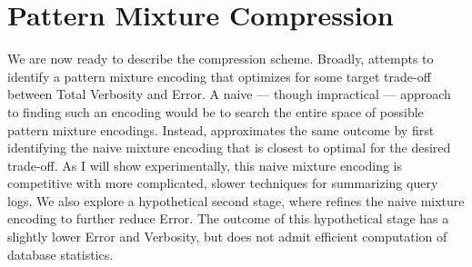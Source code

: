 \section{Pattern Mixture Compression}
\label{sec:constructingencodings}
We are now ready to describe the \systemnameone compression scheme.
Broadly, \systemnameone attempts to identify a pattern mixture encoding that optimizes for some target trade-off between Total Verbosity and Error.  
A naive --- though impractical --- approach to finding such an encoding would be to search the entire space of possible pattern mixture encodings.
Instead, \systemnameone approximates the same outcome by first identifying the naive mixture encoding that is closest to optimal for the desired trade-off.
As I will show experimentally, this naive mixture encoding is competitive with more complicated, slower techniques for summarizing query logs.
We also explore a hypothetical second stage, where \systemnameone refines the naive mixture encoding to further reduce Error.
The outcome of this hypothetical stage has a slightly lower Error and Verbosity, but does not admit efficient computation of database statistics. 

